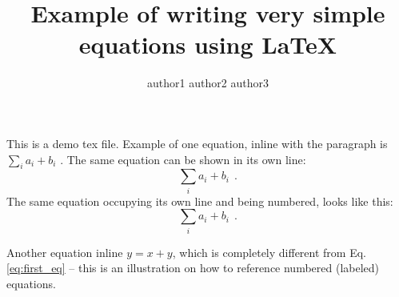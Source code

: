 \documentclass[a4paper]{IEEEconf}
\title{Example of writing very simple equations using LaTeX}
\author{author1 author2 author3}
\begin{document}
\maketitle


This is a demo tex file. Example of one equation, inline with the paragraph is
$ \sum\limits_i {a_i  + b_i } $ .
%
The same equation can be shown in its own line:
$$ \sum\limits_i {a_i  + b_i } \ \ . $$
%
The same equation occupying its own line and being numbered, looks like this: 
%
\begin{equation}
 \sum\limits_i {a_i  + b_i }
 \label{eq:first_eq}  \ \ .
\end{equation}

Another equation inline $y=x+y$, which is completely different from Eq.\ref{eq:first_eq} -- this is an illustration on how to reference numbered (labeled) equations.
\end{document}
